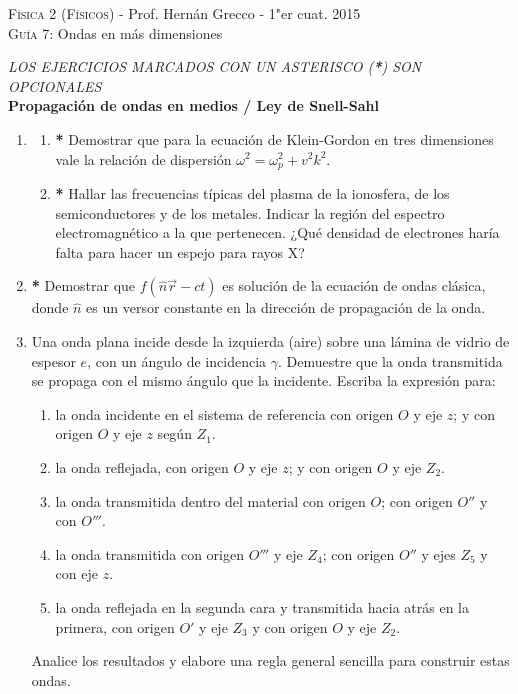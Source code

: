 \documentclass[11pt,spanish,a4paper]{article}
\begin{document}
\begin{center}
    \textsc{\large Física 2 (Físicos)} - Prof. Hernán Grecco - 1"er cuat. 2015\\
	\textsc{\large Guía 7:}	Ondas en más dimensiones
\end{center}


\emph{LOS EJERCICIOS MARCADOS CON UN ASTERISCO (\textbf{*}) SON OPCIONALES}\\


\textbf{Propagación de ondas en medios / Ley de Snell-Sahl}

\begin{enumerate}
\item
\begin{enumerate}
	\item \textbf{*} Demostrar que para la ecuación de Klein-Gordon en tres dimensiones vale la relación de dispersión \(\omega^2= \omega_p^2 + v^2 k^2\).
	\item \textbf{*} Hallar las frecuencias típicas del plasma de la ionosfera, de los semiconductores y de los metales.
		Indicar la región del espectro electromagnético a la que pertenecen.
		¿Qué densidad de electrones haría falta para hacer un espejo para rayos X?
\end{enumerate}


\item \textbf{*} Demostrar que \(f(\hat{n} \vec{r} - ct)\) es solución de la ecuación de ondas clásica, donde \(\hat{n}\) es un versor constante en la dirección de propagación de la onda.


\item Una onda plana incide desde la izquierda (aire) sobre una lámina de vidrio de espesor \(e\), con un ángulo de incidencia \(\gamma\).
	Demuestre que la onda transmitida se propaga con el	mismo ángulo que la incidente.
	Escriba la expresión para:
	\begin{enumerate}
		\item la onda incidente en el sistema de referencia con origen \(O\) y eje \(z\); y con origen \(O\) y eje \(z\) según \(Z_1\).
		\item la onda reflejada, con origen \(O\) y eje \(z\); y con origen \(O\) y eje \(Z_2\).
		\item la onda transmitida dentro del material con origen \(O\); con origen \(O''\) y con \(O'''\).
		\item la onda transmitida con origen \(O'''\) y eje \(Z_4\); con origen \(O''\) y ejes \(Z_5\) y con eje \(z\).
		\item la onda reflejada en la segunda cara y transmitida hacia atrás en la primera, con origen \(O'\) y eje \(Z_3\) y con origen \(O\) y eje \(Z_2\).
	\end{enumerate}
	Analice los resultados y elabore una regla general sencilla para construir estas ondas.


\end{enumerate}
\end{document}

